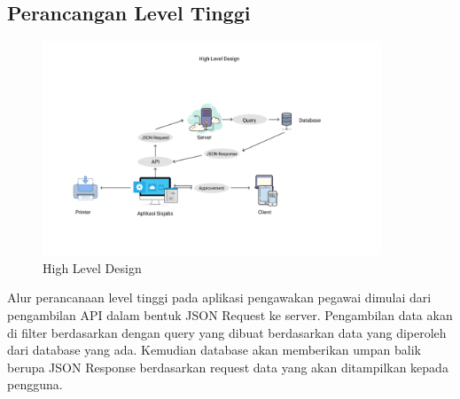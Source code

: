 \begin{table}
\begin{tabular}{ | c | c | p{35mm} |}
		
		\hline
		
	\end{tabular}
\end{table}

\subsection{Perancangan Level Tinggi}

\begin{figure}
	\centering
	\includegraphics[width=0.9\textwidth]
	{pics/highleveldesign.png}
	\caption{High Level Design}
	\label{fig:34}
\end{figure}

Alur perancanaan level tinggi pada aplikasi pengawakan pegawai dimulai dari pengambilan API dalam bentuk JSON Request ke server. Pengambilan data akan di filter berdasarkan dengan query yang dibuat berdasarkan data yang diperoleh dari database yang ada. Kemudian database akan memberikan umpan balik berupa JSON Response berdasarkan request data yang akan ditampilkan kepada pengguna. 

